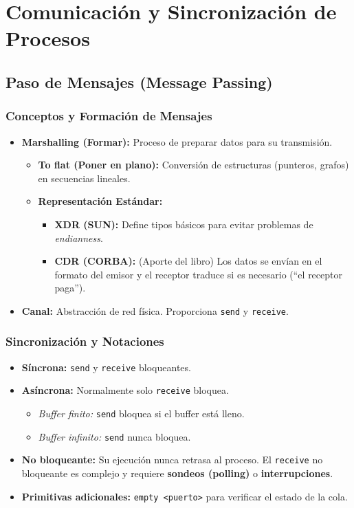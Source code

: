 
\chapter{Comunicación y Sincronización de Procesos}

\section{Paso de Mensajes (Message Passing)}

\subsection{Conceptos y Formación de Mensajes}
\begin{itemize}
    \item \textbf{Marshalling (Formar):} Proceso de preparar datos para su transmisión.
    \begin{itemize}
        \item \textbf{To flat (Poner en plano):} Conversión de estructuras (punteros, grafos) en secuencias lineales.
        \item \textbf{Representación Estándar:} 
        \begin{itemize}
            \item \textbf{XDR (SUN):} Define tipos básicos para evitar problemas de \textit{endianness}.
            \item \textbf{CDR (CORBA):} (Aporte del libro) Los datos se envían en el formato del emisor y el receptor traduce si es necesario (``el receptor paga'').
        \end{itemize}
    \end{itemize}
    \item \textbf{Canal:} Abstracción de red física. Proporciona \texttt{send} y \texttt{receive}.
\end{itemize}

\subsection{Sincronización y Notaciones}
\begin{itemize}
    \item \textbf{Síncrona:} \texttt{send} y \texttt{receive} bloqueantes.
    \item \textbf{Asíncrona:} Normalmente solo \texttt{receive} bloquea.
    \begin{itemize}
        \item \textit{Buffer finito:} \texttt{send} bloquea si el buffer está lleno.
        \item \textit{Buffer infinito:} \texttt{send} nunca bloquea.
    \end{itemize}
    \item \textbf{No bloqueante:} Su ejecución nunca retrasa al proceso. El \texttt{receive} no bloqueante es complejo y requiere \textbf{sondeos (polling)} o \textbf{interrupciones}.
    \item \textbf{Primitivas adicionales:} \texttt{empty <puerto>} para verificar el estado de la cola.
\end{itemize}

